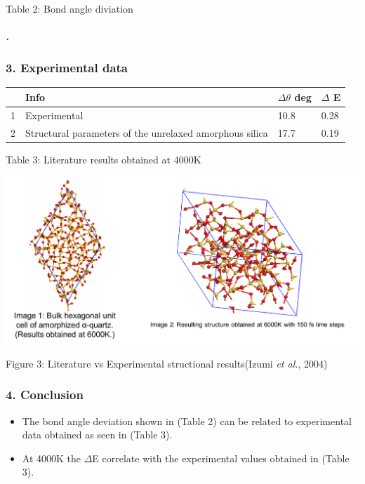 \documentclass[]{article}
\providecommand{\tightlist}{%
  \setlength{\itemsep}{0pt}\setlength{\parskip}{0pt}}
\let\oldsubparagraph\subparagraph
\renewcommand{\subparagraph}[1]{\oldsubparagraph{#1}\mbox{}}
\begin{document}
Table 2: Bond angle diviation

\hypertarget{section-2}{%
\subparagraph{.}\label{section-2}}

\hypertarget{experimental-data}{%
\subsubsection{3. Experimental data}\label{experimental-data}}

\begin{longtable}[]{@{}llll@{}}
\toprule
& Info & \(\Delta \theta\) deg & \(\Delta\) E\tabularnewline
\midrule
\endhead
1 & Experimental & 10.8 & 0.28\tabularnewline
2 & Structural parameters of the unrelaxed amorphous silica & 17.7 &
0.19\tabularnewline
\bottomrule
\end{longtable}

Table 3: Literature results obtained at 4000K

\begin{center}\includegraphics[width=0.9\linewidth]{Report1/DATA/amorph-pics} \end{center}

Figure 3: Literature vs Experimental structional results(Izumi \emph{et
al.}, 2004)

\hypertarget{conclusion}{%
\subsubsection{4. Conclusion}\label{conclusion}}

\begin{itemize}
\tightlist
\item
  The bond angle deviation shown in (Table 2) can be related to
  experimental data obtained as seen in (Table 3).
\item
  At 4000K the \(\Delta\)Ε correlate with the experimental values
  obtained in (Table 3).
\end{itemize}
\end{document}
